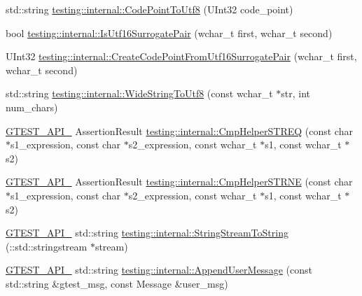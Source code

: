 \begin{DoxyCompactItemize}
\item 
std\+::string \mbox{\hyperlink{namespacetesting_1_1internal_a0c0f9558efb9abb965851c4738cdc725}{testing\+::internal\+::\+Code\+Point\+To\+Utf8}} (U\+Int32 code\+\_\+point)
\item 
bool \mbox{\hyperlink{namespacetesting_1_1internal_a681895f8cc32286211be9889da107394}{testing\+::internal\+::\+Is\+Utf16\+Surrogate\+Pair}} (wchar\+\_\+t first, wchar\+\_\+t second)
\item 
U\+Int32 \mbox{\hyperlink{namespacetesting_1_1internal_ac8ef1bb10cd9e69de939789b759e6bc9}{testing\+::internal\+::\+Create\+Code\+Point\+From\+Utf16\+Surrogate\+Pair}} (wchar\+\_\+t first, wchar\+\_\+t second)
\item 
std\+::string \mbox{\hyperlink{namespacetesting_1_1internal_a05b8c86ff38243f34d8f839a0eadefb1}{testing\+::internal\+::\+Wide\+String\+To\+Utf8}} (const wchar\+\_\+t $\ast$str, int num\+\_\+chars)
\item 
\mbox{\hyperlink{_obj__test_2lib_2googletest-release-1_88_81_2googletest_2include_2gtest_2internal_2gtest-port_8h_aa73be6f0ba4a7456180a94904ce17790}{G\+T\+E\+S\+T\+\_\+\+A\+P\+I\+\_\+}} Assertion\+Result \mbox{\hyperlink{namespacetesting_1_1internal_ad351878f87634853c4eb005fe9b169a8}{testing\+::internal\+::\+Cmp\+Helper\+S\+T\+R\+EQ}} (const char $\ast$s1\+\_\+expression, const char $\ast$s2\+\_\+expression, const wchar\+\_\+t $\ast$s1, const wchar\+\_\+t $\ast$s2)
\item 
\mbox{\hyperlink{_obj__test_2lib_2googletest-release-1_88_81_2googletest_2include_2gtest_2internal_2gtest-port_8h_aa73be6f0ba4a7456180a94904ce17790}{G\+T\+E\+S\+T\+\_\+\+A\+P\+I\+\_\+}} Assertion\+Result \mbox{\hyperlink{namespacetesting_1_1internal_a415a953647bbc9469f062dc966061efb}{testing\+::internal\+::\+Cmp\+Helper\+S\+T\+R\+NE}} (const char $\ast$s1\+\_\+expression, const char $\ast$s2\+\_\+expression, const wchar\+\_\+t $\ast$s1, const wchar\+\_\+t $\ast$s2)
\item 
\mbox{\hyperlink{_obj__test_2lib_2googletest-release-1_88_81_2googletest_2include_2gtest_2internal_2gtest-port_8h_aa73be6f0ba4a7456180a94904ce17790}{G\+T\+E\+S\+T\+\_\+\+A\+P\+I\+\_\+}} std\+::string \mbox{\hyperlink{namespacetesting_1_1internal_ac0a2b7f69fc829d80a39e925b6417e39}{testing\+::internal\+::\+String\+Stream\+To\+String}} (\+::std\+::stringstream $\ast$stream)
\item 
\mbox{\hyperlink{_obj__test_2lib_2googletest-release-1_88_81_2googletest_2include_2gtest_2internal_2gtest-port_8h_aa73be6f0ba4a7456180a94904ce17790}{G\+T\+E\+S\+T\+\_\+\+A\+P\+I\+\_\+}} std\+::string \mbox{\hyperlink{namespacetesting_1_1internal_ae475a090bca903bb222dd389eb189166}{testing\+::internal\+::\+Append\+User\+Message}} (const std\+::string \&gtest\+\_\+msg, const Message \&user\+\_\+msg)

\end{DoxyCompactItemize}
